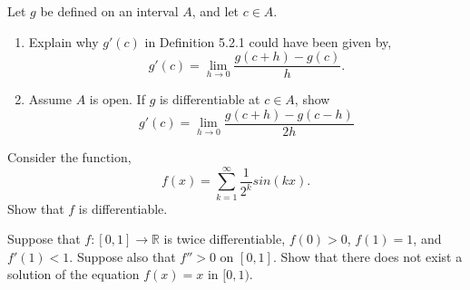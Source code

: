\documentclass[12pt]{article}
\makeatletter
\theoremstyle{homework}
\newenvironment{exercise}[1]
{\def\@currentlabel{#1}\exercisecore}
{\endexercisecore}
\newcommand{\Reals}{\ensuremath{\mathbb R}}
\makeatother
\begin{document}
\begin{exercise}{8} Let $g$ be defined on an interval $A$, and let $c \in A.$\\
  \begin{enumerate}
    \item Explain why $g'(c)$ in Definition 5.2.1 could have been given by,
    \begin{equation*}
      g'(c) = \lim_{h \to 0} \dfrac{g(c+h) - g(c)}{h}.
    \end{equation*}


    \item  Assume $A$ is open. If $g$ is differentiable at $c \in A$, show
    \begin{equation*}
      g'(c) = \lim_{h \to 0} \dfrac{g(c+h) - g(c - h)}{2h}
    \end{equation*}
  \end{enumerate}
  
\end{exercise}
\vspace{.5in}




\begin{exercise}{9} Consider the function,
  \begin{equation*}
    f(x) = \sum_{k = 1}^{\infty} \dfrac{1}{2^k} sin(kx).
  \end{equation*}
  Show that $f$ is differentiable.
  
\end{exercise}
\vspace{.5in}




\begin{exercise}{10} Suppose that $f: [0,1] \to \Reals$ is twice differentiable, $f(0) > 0$, $f(1) = 1$, 
  and $f'(1) < 1$. Suppose also that $f'' > 0$ on $[0,1]$. Show that there does not exist a solution of the equation
  $f(x) = x$ in $[0,1)$.
  
\end{exercise}
\vspace{.5in}
\end{document}

